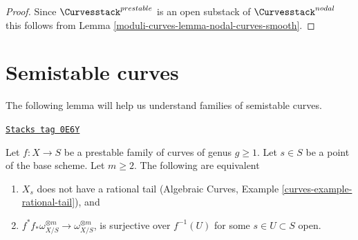 \begin{proof}
Since $\Curvesstack^{prestable}$ is an open substack of
$\Curvesstack^{nodal}$ this follows from
Lemma \ref{moduli-curves-lemma-nodal-curves-smooth}.
\end{proof}

\section{Semistable curves}
\label{moduli-curves-section-semistable-curves}
The following lemma will help us understand families of semistable curves.

\begin{lemma}[Semistable]
\label{moduli-curves-lemma-semistable}
\href{https://stacks.math.columbia.edu/tag/0E6Y}{\texttt{Stacks tag 0E6Y}}

Let $f : X \to S$ be a prestable family of curves of genus $g \geq 1$.
Let $s \in S$ be a point of the base scheme. Let $m \geq 2$.
The following are equivalent
\begin{enumerate}
\item $X_s$ does not have a rational tail
(Algebraic Curves, Example \ref{curves-example-rational-tail}), and
\item $f^*f_*\omega_{X/S}^{\otimes m} \to \omega_{X/S}^{\otimes m}$,
is surjective over $f^{-1}(U)$ for some $s \in U \subset S$ open.
\end{enumerate}
\end{lemma}

